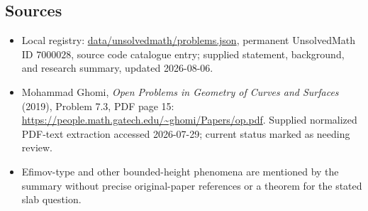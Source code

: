 \documentclass[11pt]{article}
\begin{document}
\subsection{Sources}
\begin{itemize}
\item Local registry: \url{data/unsolvedmath/problems.json}, permanent UnsolvedMath ID \(7000028\), source code catalogue entry; supplied statement, background, and research summary, updated 2026-08-06.
\item Mohammad Ghomi, \emph{Open Problems in Geometry of Curves and Surfaces} (2019), Problem 7.3, PDF page 15: \url{https://people.math.gatech.edu/~ghomi/Papers/op.pdf}. Supplied normalized PDF-text extraction accessed 2026-07-29; current status marked as needing review.
\item Efimov-type and other bounded-height phenomena are mentioned by the summary without precise original-paper references or a theorem for the stated slab question.
\end{itemize}
\end{document}
